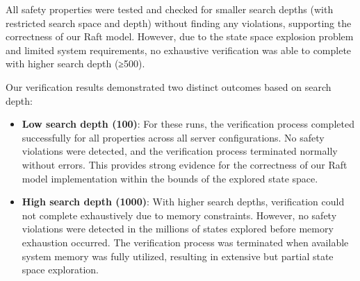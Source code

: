 \begin{table}[!htbp]
\centering
\caption{Crash and Recovery Properties Verification Results}
\label{tab:crash-recovery}
\end{table}

All safety properties were tested and checked for smaller search depths (with restricted search space and depth) without finding any violations, supporting the correctness of our Raft model. However, due to the state space explosion problem and limited system requirements, no exhaustive verification was able to complete with higher search depth (≥500).

Our verification results demonstrated two distinct outcomes based on search depth:

\begin{itemize}
    \item \textbf{Low search depth (100)}: For these runs, the verification process completed successfully for all properties across all server configurations. No safety violations were detected, and the verification process terminated normally without errors. This provides strong evidence for the correctness of our Raft model implementation within the bounds of the explored state space.
    
    \item \textbf{High search depth (1000)}: With higher search depths, verification could not complete exhaustively due to memory constraints. However, no safety violations were detected in the millions of states explored before memory exhaustion occurred. The verification process was terminated when available system memory was fully utilized, resulting in extensive but partial state space exploration.
\end{itemize}

